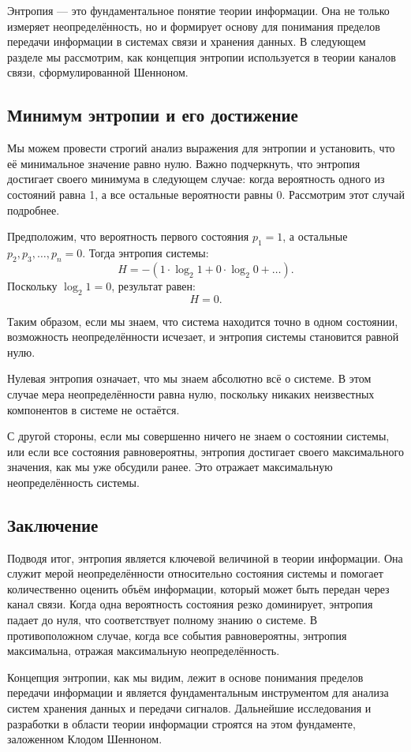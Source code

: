 \documentclass[12pt,a4paper]{article}
\newenvironment{exbox}[1][]{%
  \begin{tcolorbox}[enhanced, breakable, colback=excolor, colframe=brown!50!black, title=#1, fonttitle=\bfseries, arc=3pt, boxrule=0.5pt]
}{\end{tcolorbox}}
\newenvironment{rembox}[1][]{%
  \begin{tcolorbox}[enhanced, breakable, colback=gray!5, colframe=gray!50, title=#1, fonttitle=\bfseries, arc=3pt, boxrule=0.5pt]
}{\end{tcolorbox}}
\begin{document}
Энтропия — это фундаментальное понятие теории информации. Она не только измеряет неопределённость, но и формирует основу для понимания пределов передачи информации в системах связи и хранения данных. В следующем разделе мы рассмотрим, как концепция энтропии используется в теории каналов связи, сформулированной Шенноном.
\subsection{Минимум энтропии и его достижение}

Мы можем провести строгий анализ выражения для энтропии и установить, что её минимальное значение равно нулю. Важно подчеркнуть, что энтропия достигает своего минимума в следующем случае: когда вероятность одного из состояний равна 1, а все остальные вероятности равны 0. Рассмотрим этот случай подробнее.

\begin{exbox}[Пример минимальной энтропии]
Предположим, что вероятность первого состояния $p_1 = 1$, а остальные $p_2, p_3, \dots, p_n = 0$. Тогда энтропия системы:
\[
H = - \left( 1 \cdot \log_2 1 + 0 \cdot \log_2 0 + \dots \right).
\]
Поскольку $\log_2 1 = 0$, результат равен:
\[
H = 0.
\]
\end{exbox}

Таким образом, если мы знаем, что система находится точно в одном состоянии, возможность неопределённости исчезает, и энтропия системы становится равной нулю.

\begin{rembox}[Нулевая энтропия]
Нулевая энтропия означает, что мы знаем абсолютно всё о системе. В этом случае мера неопределённости равна нулю, поскольку никаких неизвестных компонентов в системе не остаётся.
\end{rembox}

С другой стороны, если мы совершенно ничего не знаем о состоянии системы, или если все состояния равновероятны, энтропия достигает своего максимального значения, как мы уже обсудили ранее. Это отражает максимальную неопределённость системы.

\subsection{Заключение}

Подводя итог, энтропия является ключевой величиной в теории информации. Она служит мерой неопределённости относительно состояния системы и помогает количественно оценить объём информации, который может быть передан через канал связи. Когда одна вероятность состояния резко доминирует, энтропия падает до нуля, что соответствует полному знанию о системе. В противоположном случае, когда все события равновероятны, энтропия максимальна, отражая максимальную неопределённость.

Концепция энтропии, как мы видим, лежит в основе понимания пределов передачи информации и является фундаментальным инструментом для анализа систем хранения данных и передачи сигналов. Дальнейшие исследования и разработки в области теории информации строятся на этом фундаменте, заложенном Клодом Шенноном.
\end{document}
